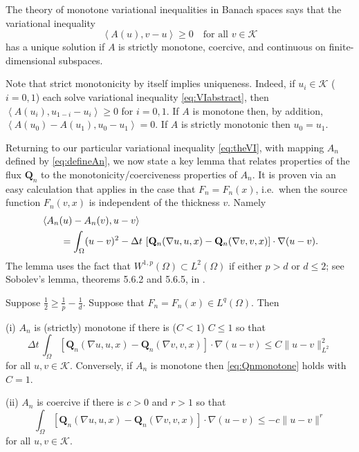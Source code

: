 \documentclass[final,leqno,onefignum,onetabnum]{siamltex1213bueler}
\newcommand\bQ{\mathbf{Q}}
\renewcommand{\grad}{\nabla}
\newcommand{\ip}[2]{\ensuremath{\left<#1,#2\right>}}
\begin{document}
The theory of monotone variational inequalities in Banach spaces \cite[chapter III]{KinderlehrerStampacchia} says that the variational inequality
\begin{equation}
    \ip{A(u)}{v-u} \ge 0 \quad \text{for all $v\in\mathcal{K}$} \label{eq:VIabstract}
\end{equation}
has a unique solution if $A$ is strictly monotone, coercive, and continuous on finite-dimensional subspaces.

Note that strict monotonicity by itself implies uniqueness.  Indeed, if $u_i \in \mathcal{K}$ ($i=0,1$) each solve variational inequality \eqref{eq:VIabstract}, then $\ip{A(u_i)}{u_{1-i}-u_i} \ge 0$ for $i=0,1$.  If $A$ is monotone then, by addition, $\ip{A(u_0) - A(u_1)}{u_0 - u_1} = 0$.  If $A$ is strictly monotonic then $u_0=u_1$.

Returning to our particular variational inequality \eqref{eq:theVI}, with mapping $A_n$ defined by \eqref{eq:defineAn}, we now state a key lemma that relates properties of the flux $\bQ_n$ to the monotonicity/coerciveness properties of $A_n$.  It is proven via an easy calculation that applies in the case that $F_n=F_n(x)$, i.e.~when the source function $F_n(v,x)$ is independent of the thickness $v$.  Namely
\begin{align}
   &\ip{A_n(u) - A_n(v)}{u-v}  \label{eq:AtoQcalculation} \\
   &\qquad = \int_\Omega (u-v)^2 - \Delta t\, \left[\bQ_n(\grad u,u,x) - \bQ_n(\grad v,v,x)\right] \cdot \grad(u-v).  \notag
\end{align}
The lemma uses the fact that $W^{1,p}(\Omega) \subset L^2(\Omega)$ if either $p>d$ or $d\le 2$; see Sobolev's lemma, theorems 5.6.2 and 5.6.5, in \cite{Evans}.

\begin{lemma}  \label{lem:monotonecoercive}  Suppose $\frac{1}{2} \ge \frac{1}{p} - \frac{1}{d}$.  Suppose that $F_n=F_n(x) \in L^q(\Omega)$.  Then

(i)  $A_n$ is (strictly) monotone if there is ($C<1$) $C\le 1$ so that
\begin{equation}
\Delta t\, \int_\Omega \left[\bQ_n(\grad u,u,x) - \bQ_n(\grad v,v,x)\right] \cdot \grad(u-v) \le C \|u-v\|_{L^2}^2 \label{eq:Qnmonotone}
\end{equation}
for all $u,v \in \mathcal{K}$.  Conversely, if $A_n$ is monotone then \eqref{eq:Qnmonotone} holds with $C=1$.

(ii)  $A_n$ is coercive if there is $c>0$ and $r>1$ so that
\begin{equation}
\int_\Omega \left[\bQ_n(\grad u,u,x) - \bQ_n(\grad v,v,x)\right] \cdot \grad(u-v) \le - c \|u-v\|^r \label{eq:Qncoercive}
\end{equation}
for all $u,v \in \mathcal{K}$.
\end{lemma}
\end{document}
